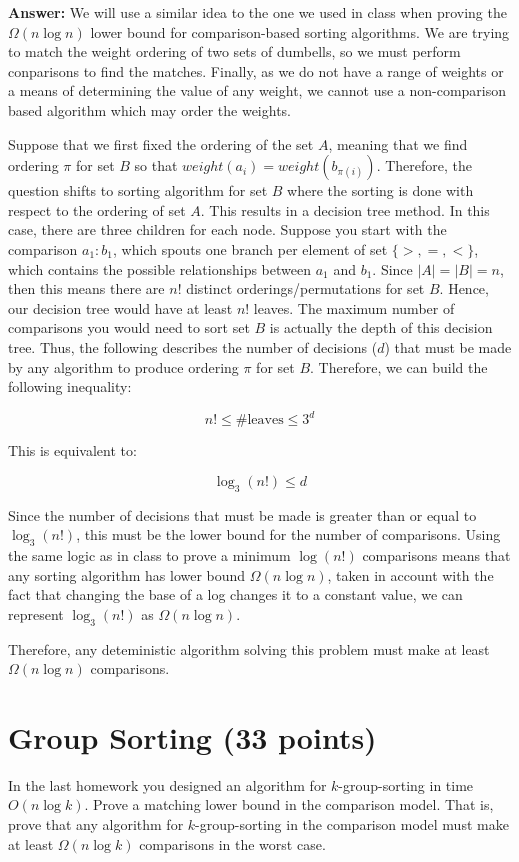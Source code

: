 \documentclass[11pt]{article}
\begin{document}
\bigbreak

\textbf{Answer:} 
We will use a similar idea to the one we used in class when proving the $\Omega(n \log n)$ lower bound for comparison-based sorting algorithms. 
We are trying to match the weight ordering of two sets of dumbells, so we must perform conparisons to find the matches. 
Finally, as we do not have a range of weights or a means of determining the value of any weight, we cannot use a non-comparison based algorithm 
which may order the weights. 

Suppose that we first fixed the ordering of the set $A$, meaning that we find ordering $\pi$ for set $B$ so that 
$weight(a_i)=weight(b_{\pi(i)})$. Therefore, the question shifts to sorting algorithm for set $B$ 
where the sorting is done with respect to the ordering of set $A$. This results in a decision tree method. 
In this case, there are three children for each node. Suppose you start with the comparison $a_1:b_1$, which spouts  one branch per element of set $\{>,=,<\}$, 
which contains the possible relationships between $a_1$ and $b_1$. Since $|A|=|B|=n$, then this means there are $n!$ distinct orderings/permutations for set $B$. 
Hence, our decision tree would have at least $n!$ leaves. The maximum number of comparisons you would need to sort set $B$ is actually the depth of 
this decision tree. Thus, the following describes the number of decisions ($d$) that must be made by any algorithm to produce ordering $\pi$ for set $B$.
Therefore, we can build the following inequality:

$$n! \leq \#\text{leaves}\leq 3^d$$

This is equivalent to:

$$\log_{3}(n!)\leq d$$

Since the number of decisions that must be made is greater than or equal to $\log_3 (n!)$, this must be the lower bound for the number of comparisons. 
Using the same logic as in class to prove a minimum $\log(n!)$ comparisons means that any sorting algorithm has lower bound $\Omega(n \log n)$, 
taken in account with the fact that changing the base of a log changes it to a constant value, we can represent $\log_3 (n!)$ as $\Omega(n \log n)$. 

Therefore, any deteministic algorithm solving this problem must make at least $\Omega(n \log n)$ comparisons.

\section{Group Sorting (33 points)}
In the last homework you designed an algorithm for $k$-group-sorting in time $O(n \log k)$. 
Prove a matching lower bound in the comparison model. 
That is, prove that any algorithm for $k$-group-sorting in the comparison model must make at least $\Omega(n \log k)$ comparisons in the worst case.
\end{document}

